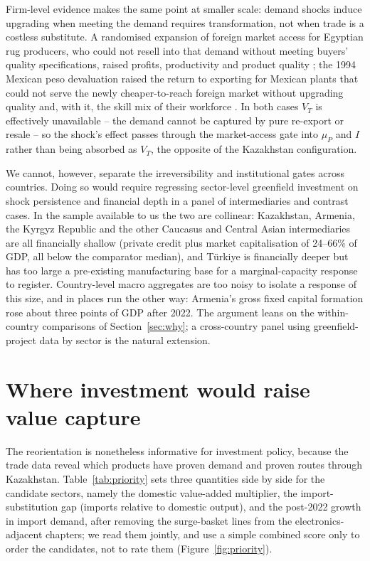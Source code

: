 \documentclass[12pt]{article}
\begin{document}
Firm-level evidence makes the same point at smaller scale: demand shocks induce upgrading
when meeting the demand requires transformation, not when trade is a costless substitute.
A randomised expansion of foreign market access for Egyptian rug producers, who could not
resell into that demand without meeting buyers' quality specifications, raised
profits, productivity and product quality \citep{atkinkhandelwalosman2017}; the 1994 Mexican
peso devaluation raised the return to exporting for Mexican plants that could not serve the
newly cheaper-to-reach foreign market without upgrading quality and, with it, the skill mix
of their workforce \citep{verhoogen2008}. In both cases $V_T$ is effectively unavailable --
the demand cannot be captured by pure re-export or resale -- so the shock's effect passes
through the market-access gate into $\mu_P$ and $I$ rather than being absorbed as $V_T$, the
opposite of the Kazakhstan configuration.

We cannot, however, separate the irreversibility and institutional
gates across countries. Doing so would require regressing sector-level greenfield investment on
shock persistence and financial depth in a panel of intermediaries and contrast cases. In the sample available
to us the two are collinear: Kazakhstan, Armenia, the Kyrgyz Republic and the other Caucasus
and Central Asian intermediaries are all financially shallow (private credit plus market
capitalisation of 24--66\% of GDP, all below the comparator median), and T\"urkiye is
financially deeper but has too large a pre-existing manufacturing base for a marginal-capacity
response to register. Country-level macro aggregates are too noisy to isolate a
response of this size, and in places run the other way:
Armenia's gross fixed capital formation rose about three points of GDP after 2022.
The argument leans on the within-country comparisons of Section~\ref{sec:why}; a
cross-country panel using greenfield-project data by sector is the natural extension.

\section{Where investment would raise value capture}\label{sec:where}

The reorientation is nonetheless informative for investment policy, because the trade data
reveal which products have proven demand and proven routes through Kazakhstan. Table~\ref{tab:priority}
sets three quantities side by side for the candidate sectors, namely the domestic value-added
multiplier, the import-substitution gap (imports relative to domestic output), and the
post-2022 growth in import demand, after removing the surge-basket lines from the
electronics-adjacent chapters; we read them jointly, and use a simple combined score only to
order the candidates, not to rate them (Figure~\ref{fig:priority}).
\end{document}
